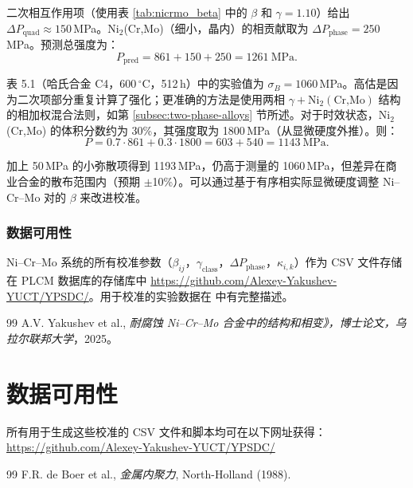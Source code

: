 \documentclass[12pt,a4paper]{article}
\begin{document}
	二次相互作用项（使用表 \ref{tab:nicrmo_beta} 中的 $\beta$ 和 $\gamma=1.10$）给出 $\Delta P_{\text{quad}} \approx 150$\,MPa。Ni$_2$(Cr,Mo)（细小，晶内）的相贡献取为 $\Delta P_{\text{phase}} = 250$\,MPa。预测总强度为：
	\[
	P_{\text{pred}} = 861 + 150 + 250 = 1261\ \text{MPa}.
	\]
	
	表 5.1（哈氏合金 C4，600\,\(^{\circ}\)C，512\,h）中的实验值为 $\sigma_B = 1060$\,MPa。高估是因为二次项部分重复计算了强化；更准确的方法是使用两相 $\gamma + \text{Ni}_2(\text{Cr,Mo})$ 结构的相加权混合法则，如第 \ref{subsec:two-phase-alloys} 节所述。对于时效状态，Ni$_2$(Cr,Mo) 的体积分数约为 30\%，其强度取为 1800\,MPa（从显微硬度外推）。则：
	\[
	P = 0.7\cdot861 + 0.3\cdot1800 = 603 + 540 = 1143\ \text{MPa}.
	\]
	
	加上 50\,MPa 的小弥散项得到 1193\,MPa，仍高于测量的 1060\,MPa，但差异在商业合金的散布范围内（预期 $\pm$10\%）。可以通过基于有序相实际显微硬度调整 Ni–Cr–Mo 对的 $\beta$ 来改进校准。
	
	\subsubsection{数据可用性}
	Ni–Cr–Mo 系统的所有校准参数（$\beta_{ij}$，$\gamma_{\text{class}}$，$\Delta P_{\text{phase}}$，$\kappa_{i,k}$）作为 CSV 文件存储在 PLCM 数据库的存储库中 \url{https://github.com/Alexey-Yakushev-YUCT/YPSDC/}。用于校准的实验数据在 \cite{dis2025} 中有完整描述。
	
	\begin{thebibliography}{99}
		 A.V. Yakushev et al., \emph{耐腐蚀 Ni–Cr–Mo 合金中的结构和相变》，博士论文，乌拉尔联邦大学}，2025。
		\end{thebibliography}
		
		
		\section{数据可用性}
		所有用于生成这些校准的 CSV 文件和脚本均可在以下网址获得：
		\url{https://github.com/Alexey-Yakushev-YUCT/YPSDC/}
		
		\begin{thebibliography}{99}
			 F.R. de Boer et al., \emph{金属内聚力}, North-Holland (1988).
		\end{thebibliography}
		
	
\end{document}
